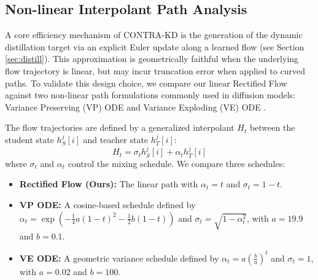 \documentclass{article} %
\theoremstyle{definition}
\theoremstyle{remark}
\begin{document}
\subsection{Non-linear Interpolant Path Analysis} 
A core efficiency mechanism of CONTRA-KD is the generation of the dynamic distillation target via an explicit Euler update along a learned flow (see Section \ref{sec:distill}). This approximation is geometrically faithful when the underlying flow trajectory is linear, but may incur truncation error when applied to curved paths. To validate this design choice, we compare our linear Rectified Flow against two non-linear path formulations commonly used in diffusion models: Variance Preserving (VP) ODE \cite{song2021scorebasedgenerativemodelingstochastic} and Variance Exploding (VE) ODE \cite{song2021scorebasedgenerativemodelingstochastic}.

The flow trajectories are defined by a generalized interpolant $H_t$ between the student state $h_S^{j}[i]$ and teacher state $h_T^{j}[i]$:
\begin{equation}
    H_t = \sigma_t h_S^{j}[i] + \alpha_t h_T^{j}[i]
\end{equation}
where $\sigma_t$ and $\alpha_t$ control the mixing schedule. We compare three schedules:
\begin{itemize}
    \item \textbf{Rectified Flow (Ours):} The linear path with $\alpha_t = t$ and $\sigma_t = 1-t$.
    \item \textbf{VP ODE:} A cosine-based schedule defined by $\alpha_t = \exp(-\frac{1}{4}a(1-t)^2 - \frac{1}{2}b(1-t))$ and $\sigma_t = \sqrt{1-\alpha_t^2}$, with $a=19.9$ and $b=0.1$.
    \item \textbf{VE ODE:} A geometric variance schedule defined by $\alpha_t = a(\frac{b}{a})^t$ and $\sigma_t = 1$, with $a=0.02$ and $b=100$.
\end{itemize}
\end{document}
